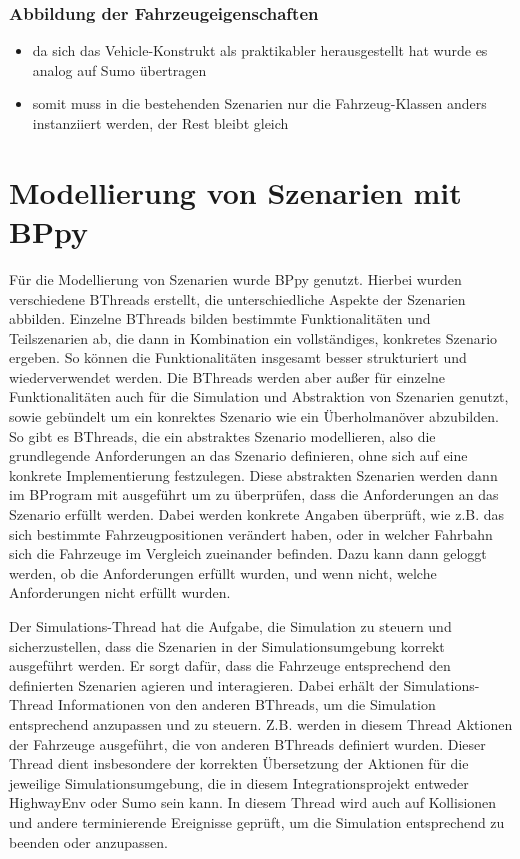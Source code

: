 \subsubsection{Abbildung der Fahrzeugeigenschaften}
\begin{itemize}
    \item da sich das Vehicle-Konstrukt als praktikabler herausgestellt hat wurde es analog auf Sumo übertragen
    \item somit muss in die bestehenden Szenarien nur die Fahrzeug-Klassen anders instanziiert werden, der Rest bleibt gleich
\end{itemize}
\section{Modellierung von Szenarien mit BPpy}
Für die Modellierung von Szenarien wurde BPpy genutzt. Hierbei wurden verschiedene BThreads erstellt, die unterschiedliche Aspekte der Szenarien abbilden.
Einzelne BThreads bilden bestimmte Funktionalitäten und Teilszenarien ab, die dann in Kombination ein vollständiges, konkretes Szenario ergeben. So können die Funktionalitäten insgesamt besser strukturiert und wiederverwendet werden.
Die BThreads werden aber außer für einzelne Funktionalitäten auch für die Simulation und Abstraktion von Szenarien genutzt, sowie gebündelt um ein konrektes Szenario wie ein Überholmanöver abzubilden.
So gibt es BThreads, die ein abstraktes Szenario modellieren, also die grundlegende Anforderungen an das Szenario definieren, ohne sich auf eine konkrete Implementierung festzulegen. Diese abstrakten Szenarien werden dann im BProgram mit ausgeführt um zu überprüfen, dass die Anforderungen an das Szenario erfüllt werden.
Dabei werden konkrete Angaben überprüft, wie z.B. das sich bestimmte Fahrzeugpositionen verändert haben, oder in welcher Fahrbahn sich die Fahrzeuge im Vergleich zueinander befinden.
Dazu kann dann geloggt werden, ob die Anforderungen erfüllt wurden, und wenn nicht, welche Anforderungen nicht erfüllt wurden.

Der Simulations-Thread hat die Aufgabe, die Simulation zu steuern und sicherzustellen, dass die Szenarien in der Simulationsumgebung korrekt ausgeführt werden. Er sorgt dafür, dass die Fahrzeuge entsprechend den definierten Szenarien agieren und interagieren.
Dabei erhält der Simulations-Thread Informationen von den anderen BThreads, um die Simulation entsprechend anzupassen und zu steuern. Z.B. werden in diesem Thread Aktionen der Fahrzeuge ausgeführt, die von anderen BThreads definiert wurden.
Dieser Thread dient insbesondere der korrekten Übersetzung der Aktionen für die jeweilige Simulationsumgebung, die in diesem Integrationsprojekt entweder HighwayEnv oder Sumo sein kann.
In diesem Thread wird auch auf Kollisionen und andere terminierende Ereignisse geprüft, um die Simulation entsprechend zu beenden oder anzupassen.


